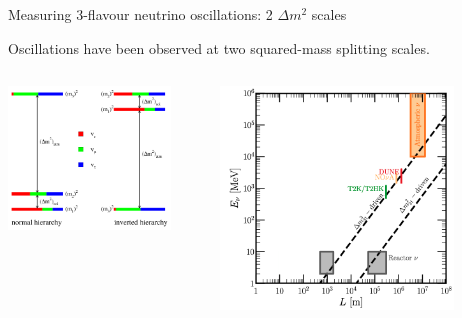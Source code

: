 %
%
%

\begin{frame}{Measuring 3-flavour neutrino oscillations: 2 $\Delta m^2$ scales}

{\small
 Oscillations have been observed at two squared-mass splitting scales.\\
}
\vspace{0.1cm}

\begin{columns}
  \begin{column}{0.50\textwidth}
    \includegraphics[width=0.85\textwidth]{./images/osc101/mh.png}
  \end{column}
  \begin{column}{0.50\textwidth}
    \includegraphics[width=0.80\textwidth]{./images/osc101/expt_L_E_no_sterile}
  \end{column}
\end{columns}


\end{frame}
